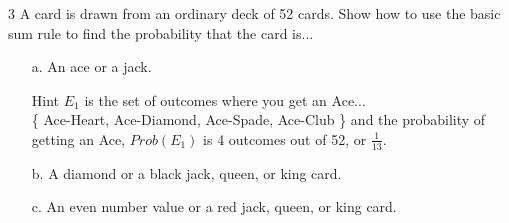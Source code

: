 \documentclass[a4paper,12pt]{book}
\newcounter{question}
\begin{document}
        \begin{question}{\thequestion}{3}
            A card is drawn from an ordinary deck of 52 cards. Show how
            to use the basic sum rule to find the probability that
            the card is...

            \begin{itemize}
                \item[a.] An ace or a jack.
                    \begin{hint}{Hint}
                        $E_{1}$ is the set of outcomes where you get an Ace... \\
                        \{ Ace-Heart, Ace-Diamond, Ace-Spade, Ace-Club \} 
                        and the probability of getting an Ace, $Prob(E_{1})$
                        is 4 outcomes out of 52, or $\frac{1}{13}$.
                    \end{hint}
                
                \item[b.] A diamond or a black jack, queen, or king card. ~\\
                
                \item[c.] An even number value or a red jack, queen, or king card. ~\\
            \end{itemize}
        \end{question}
\end{document}
